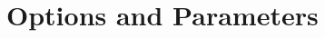 \documentclass{article}
\begin{document}



\clearpage
\section{Options and Parameters} \label{sec:parameters}
\end{document}
